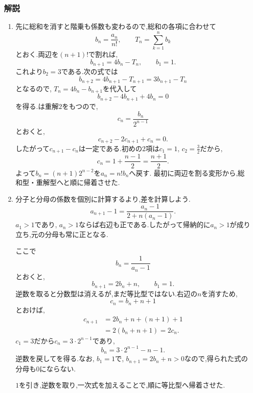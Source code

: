 \subsubsection{解説}\label{節：応用：解説}
\begin{enumerate}[label=\textbf{問\arabic*.},leftmargin=3.8em,format=\bookitemlink{practice-advanced}{solution}{problem}]
  \item 先に総和を消すと階乗も係数も変わるので,総和の各項に合わせて
    \[
      b_n=\frac{a_n}{n!},\qquad
      T_n=\sum_{k=1}^{n}b_k
    \]
    とおく.両辺を$(n+1)!$で割れば,
    \[
      b_{n+1}=4b_n-T_n,\qquad b_1=1.
    \]
    これより$b_2=3$である.次の式では
    \[
      b_{n+2}=4b_{n+1}-T_{n+1}
      =3b_{n+1}-T_n
    \]
    となるので, $T_n=4b_n-b_{n+1}$を代入して
    \[
      b_{n+2}-4b_{n+1}+4b_n=0
    \]
    を得る.は重解$2$をもつので,
    \[
      c_n=\frac{b_n}{2^{n-1}}
    \]
    とおくと,
    \[
      c_{n+2}-2c_{n+1}+c_n=0.
    \]
    したがって$c_{n+1}-c_n$は一定である.初めの2項は$c_1=1$, $c_2=\frac{3}{2}$だから,
    \[
      c_n=1+\frac{n-1}{2}=\frac{n+1}{2}.
    \]
    よって$b_n=(n+1)2^{n-2}$を$a_n=n!b_n$へ戻す.
    最初に両辺を割る変形から,総和型・重解型へと順に帰着させた.
  \item 分子と分母の係数を個別に計算するより,差を計算しよう.
    \[
      a_{n+1}-1
      =\frac{a_n-1}{2+n(a_n-1)}.
    \]
    $a_1>1$であり, $a_n>1$ならば右辺も正である.したがって帰納的に$a_n>1$が成り立ち,元の分母も常に正となる.

    ここで
    \[
      b_n=\frac{1}{a_n-1}
    \]
    とおくと,
    \[
      b_{n+1}=2b_n+n,\qquad b_1=1.
    \]
    逆数を取ると分数型は消えるが,まだ等比型ではない.右辺の$n$を消すため,
    \[
      c_n=b_n+n+1
    \]
    とおけば,
    \begin{align*}
      c_{n+1}
      &=2b_n+n+(n+1)+1\\
      &=2(b_n+n+1)=2c_n.
    \end{align*}
    $c_1=3$だから$c_n=3\cdot2^{n-1}$であり,
    \[
      b_n=3\cdot2^{n-1}-n-1.
    \]
    逆数を戻してを得る.なお, $b_1=1$で, $b_{n+1}=2b_n+n>0$なので,得られた式の分母も$0$にならない.

    $1$を引き,逆数を取り,一次式を加えることで,順に等比型へ帰着させた.


\end{enumerate}
